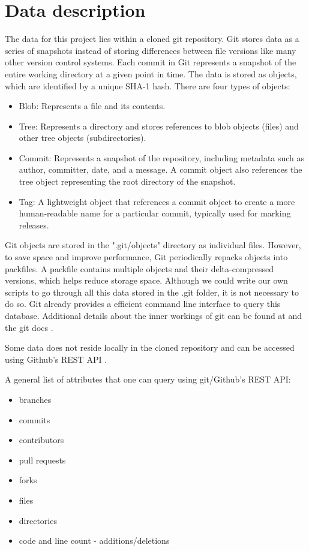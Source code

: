 \section{Data description}

The data for this project lies within a cloned git repository. Git stores data as a series of snapshots instead of storing differences between file versions like many other version control systems. Each commit in Git represents a snapshot of the entire working directory at a given point in time. The data is stored as objects, which are identified by a unique SHA-1 hash. There are four types of objects:
\begin{itemize}
    \item Blob: Represents a file and its contents.
    \item Tree: Represents a directory and stores references to blob objects (files) and other tree objects (subdirectories).
    \item Commit: Represents a snapshot of the repository, including metadata such as author, committer, date, and a message. A commit object also references the tree object representing the root directory of the snapshot.
    \item Tag: A lightweight object that references a commit object to create a more human-readable name for a particular commit, typically used for marking releases.
\end{itemize}
Git objects are stored in the ".git/objects" directory as individual files. However, to save space and improve performance, Git periodically repacks objects into packfiles. A packfile contains multiple objects and their delta-compressed versions, which helps reduce storage space.
Although we could write our own scripts to go through all this data stored in the .git folder, it is not necessary to do so. Git already provides a efficient command line interface to query this database. Additional details about the inner workings of git can be found at \cite{gitinternals} and the git docs \cite{gitdocs}. 

Some data does not reside locally in the cloned repository and can be accessed using Github's REST API \cite{gitrestapi}.

A general list of attributes that one can query using git/Github's REST API:
\begin{itemize}
    \item branches
    \item commits
    \item contributors
    \item pull requests
    \item forks
    \item files
    \item directories
    \item code and line count - additions/deletions
\end{itemize}

